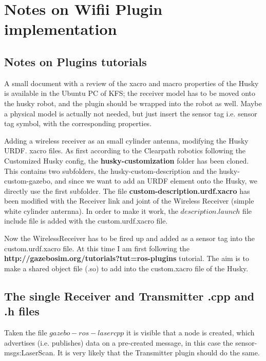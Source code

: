 \documentclass[11pt,a4paper]{article}
\begin{document}
\section{Notes on Wifii Plugin implementation} \label{sec:Plugins}

\subsection{Notes on Plugins tutorials} \label{sec:plugin_tutorials}

A small document with a review of the xacro and macro properties of the Husky is available in the Ubuntu PC of KFS; the receiver model has to be moved onto the husky robot, and the plugin should be wrapped into the robot as well. Maybe a physical model is actually not needed, but just insert the sensor tag i.e. sensor tag symbol, with the corresponding properties.

Adding a wireless receiver as an small cylinder antenna, modifying the Husky URDF. xacro files. 
As first according to the Clearpath robotics following the Customized Husky config, the \textbf{husky-customization} folder has been cloned. This contains two subfolders, the husky-custom-description and the husky-custom-gazebo, and since we want to add an URDF element onto the Husky, we directly use the first subfolder. The file \textbf{custom-description.urdf.xacro} has been modified with the Receiver link and joint of the Wireless Receiver (simple white cylinder anternna). In order to make it work, the $description.launch$ file include file is added with the custom.urdf.xacro file. 

\vskip 0.2cm

Now the WirelessReceiver has to be fired up and added as a sensor tag into the custom.urdf.xacro file. At this time I am first following the \textbf{http://gazebosim.org/tutorials?tut=ros-plugins} tutorial. The aim is to make a shared object file (.so) to add into the custom.xacro file of the Husky.

\subsection{The single Receiver and Transmitter .cpp and .h files}

Taken the file $gazebo-ros-laser cpp$ it is visible that a node is created, which advertises (i.e. publishes) data on a pre-created message, in this case the sensor-msgs:LaserScan. It is very likely that the Transmitter plugin should do the same.
\end{document}
